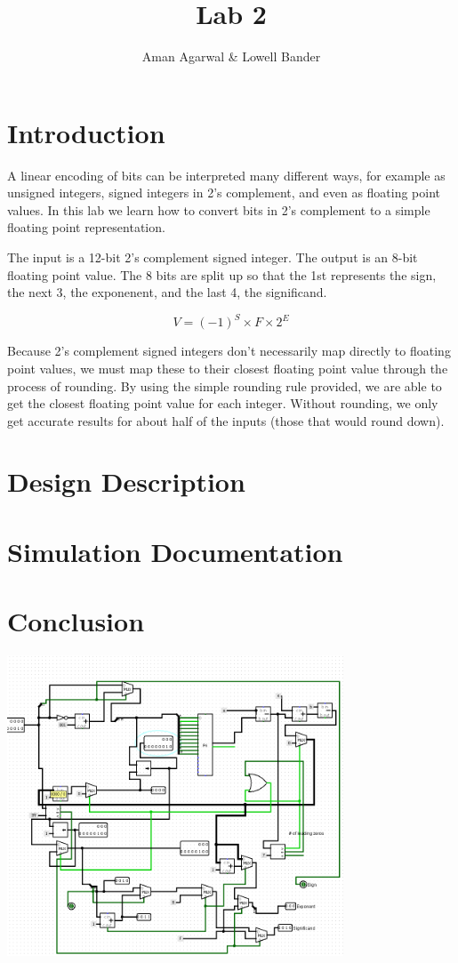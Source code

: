 \documentclass[]{article}
\newcommand{\subtitle}[1]{%
  \posttitle{%
    \par\end{center}
    \begin{center}\large#1\end{center}
    \vskip0.5em}%
}
\begin{document}
\title{Lab 2}
\subtitle{CS M152A}
\author{Aman Agarwal \& Lowell Bander}

\maketitle


\section{Introduction}

A linear encoding of bits can be interpreted many different ways, for example as unsigned integers, signed integers in 2's complement, and even as floating point values. In this lab we learn how to convert bits in 2's complement to a simple floating point representation.

The input is a 12-bit 2's complement signed integer. The output is an 8-bit floating point value. The 8 bits are split up so that the 1st represents the sign, the next 3, the exponenent, and the last 4, the significand.

\begin{displaymath}
V = (-1)^S \times F \times 2^E
\end{displaymath}

Because 2's complement signed integers don't necessarily map directly to floating point values, we must map these to their closest floating point value through the process of rounding. By using the simple rounding rule provided, we are able to get the closest floating point value for each integer. Without rounding, we only get accurate results for about half of the inputs (those that would round down).

\section{Design Description}
\section{Simulation Documentation}
\section{Conclusion}

\includegraphics[width=10cm]{logisim.PNG}
\end{document}
